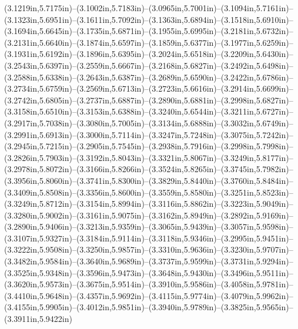 (3.1219in,5.7175in)--(3.1002in,5.7183in)--(3.0965in,5.7001in)--(3.1094in,5.7161in)--(3.1323in,5.6951in)--(3.1611in,5.7092in)--(3.1363in,5.6894in)--(3.1518in,5.6910in)--(3.1694in,5.6645in)--(3.1735in,5.6871in)--(3.1955in,5.6995in)--(3.2181in,5.6732in)--(3.2131in,5.6640in)--(3.1874in,5.6597in)--(3.1859in,5.6377in)--(3.1977in,5.6259in)--(3.1931in,5.6192in)--(3.1896in,5.6395in)--(3.2024in,5.6518in)--(3.2209in,5.6430in)--(3.2543in,5.6397in)--(3.2559in,5.6667in)--(3.2168in,5.6827in)--(3.2492in,5.6498in)--(3.2588in,5.6338in)--(3.2643in,5.6387in)--(3.2689in,5.6590in)--(3.2422in,5.6786in)--(3.2734in,5.6759in)--(3.2569in,5.6713in)--(3.2723in,5.6616in)--(3.2914in,5.6699in)--(3.2742in,5.6805in)--(3.2737in,5.6887in)--(3.2890in,5.6881in)--(3.2998in,5.6827in)--(3.3158in,5.6510in)--(3.3153in,5.6388in)--(3.3240in,5.6544in)--(3.3211in,5.6727in)--(3.2917in,5.7038in)--(3.3080in,5.7005in)--(3.3134in,5.6888in)--(3.3032in,5.6749in)--(3.2991in,5.6913in)--(3.3000in,5.7114in)--(3.3247in,5.7248in)--(3.3075in,5.7242in)--(3.2945in,5.7215in)--(3.2905in,5.7545in)--(3.2938in,5.7916in)--(3.2998in,5.7998in)--(3.2826in,5.7903in)--(3.3192in,5.8043in)--(3.3321in,5.8067in)--(3.3249in,5.8177in)--(3.2978in,5.8072in)--(3.3166in,5.8266in)--(3.3524in,5.8265in)--(3.3745in,5.7982in)--(3.3956in,5.8060in)--(3.3741in,5.8300in)--(3.3829in,5.8440in)--(3.3760in,5.8484in)--(3.3409in,5.8508in)--(3.3356in,5.8600in)--(3.3559in,5.8580in)--(3.3251in,5.8523in)--(3.3249in,5.8712in)--(3.3154in,5.8994in)--(3.3116in,5.8862in)--(3.3223in,5.9049in)--(3.3280in,5.9002in)--(3.3161in,5.9075in)--(3.3162in,5.8949in)--(3.2892in,5.9169in)--(3.2890in,5.9406in)--(3.3213in,5.9359in)--(3.3065in,5.9439in)--(3.3057in,5.9598in)--(3.3107in,5.9327in)--(3.3184in,5.9114in)--(3.3118in,5.9346in)--(3.2995in,5.9451in)--(3.3222in,5.9508in)--(3.3250in,5.9857in)--(3.3310in,5.9636in)--(3.3230in,5.9707in)--(3.3482in,5.9584in)--(3.3640in,5.9689in)--(3.3737in,5.9599in)--(3.3731in,5.9294in)--(3.3525in,5.9348in)--(3.3596in,5.9473in)--(3.3648in,5.9430in)--(3.3496in,5.9511in)--(3.3620in,5.9573in)--(3.3675in,5.9514in)--(3.3910in,5.9586in)--(3.4058in,5.9781in)--(3.4410in,5.9648in)--(3.4357in,5.9692in)--(3.4115in,5.9774in)--(3.4079in,5.9962in)--(3.4155in,5.9905in)--(3.4012in,5.9851in)--(3.3940in,5.9789in)--(3.3825in,5.9565in)--(3.3911in,5.9422in)
